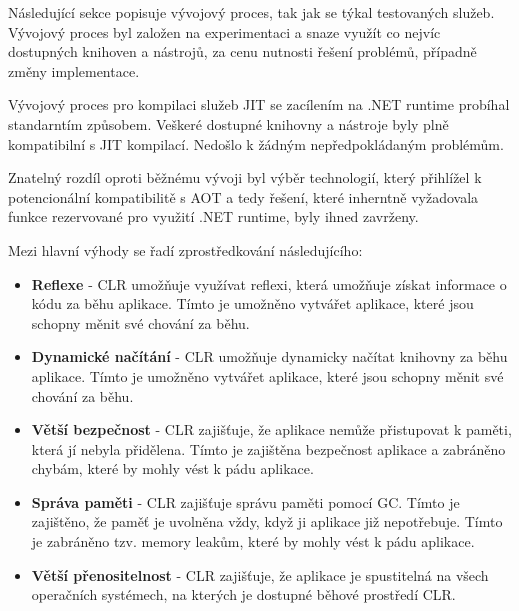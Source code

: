 

Následující sekce popisuje vývojový proces, tak jak se týkal testovaných služeb. Vývojový proces byl založen na experimentaci a snaze využít co nejvíc dostupných knihoven a nástrojů, za cenu nutnosti řešení problémů, případně změny implementace.


Vývojový proces pro kompilaci služeb JIT se zacílením na .NET runtime probíhal standarntím způsobem. Veškeré dostupné knihovny a nástroje byly plně kompatibilní s JIT kompilací. Nedošlo k žádným nepředpokládaným problémům.

Znatelný rozdíl oproti běžnému vývoji byl výběr technologií, který přihlížel k potencionální kompatibilitě s AOT a tedy řešení, které inherntně vyžadovala funkce rezervované pro využití .NET runtime, byly ihned zavrženy.


Mezi hlavní výhody se řadí zprostředkování následujícího:

\begin{itemize}
    \item  \textbf{Reflexe} - CLR umožňuje využívat reflexi, která umožňuje získat informace o kódu za běhu aplikace. Tímto je umožněno vytvářet aplikace, které jsou schopny měnit své chování za běhu.
    \item \textbf{Dynamické načítání} - CLR umožňuje dynamicky načítat knihovny za běhu aplikace. Tímto je umožněno vytvářet aplikace, které jsou schopny měnit své chování za běhu.
    \item \textbf{Větší bezpečnost} - CLR zajišťuje, že aplikace nemůže přistupovat k paměti, která jí nebyla přidělena. Tímto je zajištěna bezpečnost aplikace a zabráněno chybám, které by mohly vést k pádu aplikace.
    \item \textbf{Správa paměti} - CLR zajišťuje správu paměti pomocí GC. Tímto je zajištěno, že paměť je uvolněna vždy, když ji aplikace již nepotřebuje. Tímto je zabráněno tzv. memory leakům, které by mohly vést k pádu aplikace.
    \item \textbf{Větší přenositelnost} - CLR zajišťuje, že aplikace je spustitelná na všech operačních systémech, na kterých je dostupné běhové prostředí CLR.
\end{itemize}


